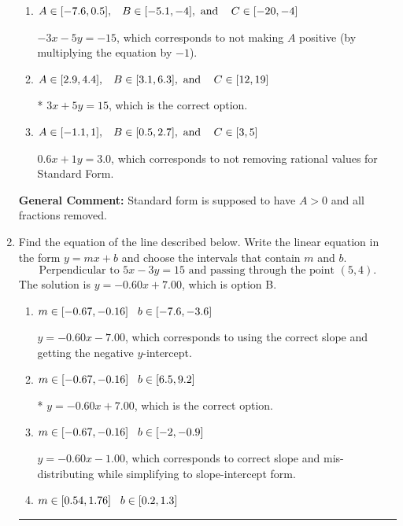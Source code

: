 \documentclass{extbook}[14pt]
\newcommand{\litem}[1]{\item #1

\rule{\textwidth}{0.4pt}}
\begin{document}
\begin{enumerate}
{\begin{enumerate}[label=\Alph*.]
 $3x - 5y = -15$, which corresponds to using the opposite (negative) slope of the graph, but did everything else correctly.
\item \( A \in [-7.6, 0.5], \hspace{3mm} B \in [-5.1, -4], \text{ and } \hspace{3mm} C \in [-20, -4] \)

 $-3x - 5y = -15$, which corresponds to not making $A$ positive (by multiplying the equation by $-1$).
\item \( A \in [2.9, 4.4], \hspace{3mm} B \in [3.1, 6.3], \text{ and } \hspace{3mm} C \in [12, 19] \)

* $3x + 5y = 15$, which is the correct option.
\item \( A \in [-1.1, 1], \hspace{3mm} B \in [0.5, 2.7], \text{ and } \hspace{3mm} C \in [3, 5] \)

 $0.6x + 1y = 3.0$, which corresponds to not removing rational values for Standard Form.
\end{enumerate}

\textbf{General Comment:} Standard form is supposed to have $A > 0$ and all fractions removed.
}
\litem{
Find the equation of the line described below. Write the linear equation in the form $ y=mx+b $ and choose the intervals that contain $m$ and $b$.
\[ \text{Perpendicular to } 5 x - 3 y = 15 \text{ and passing through the point } (5, 4). \]The solution is \( y = -0.60x + 7.00 \), which is option B.\begin{enumerate}[label=\Alph*.]
\item \( m \in [-0.67, -0.16] \hspace*{3mm} b \in [-7.6, -3.6] \)

 $y = -0.60x - 7.00$, which corresponds to using the correct slope and getting the negative $y$-intercept.
\item \( m \in [-0.67, -0.16] \hspace*{3mm} b \in [6.5, 9.2] \)

* $y = -0.60x + 7.00$, which is the correct option.
\item \( m \in [-0.67, -0.16] \hspace*{3mm} b \in [-2, -0.9] \)

 $y = -0.60x - 1.00$, which corresponds to correct slope and mis-distributing while simplifying to slope-intercept form.
\item \( m \in [0.54, 1.76] \hspace*{3mm} b \in [0.2, 1.3] \)


\end{enumerate}}
\end{enumerate}
\end{document}
